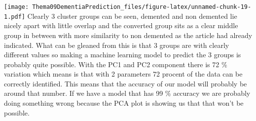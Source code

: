 \documentclass[
]{article}
\newenvironment{Shaded}{\begin{snugshade}}{\end{snugshade}}
\newcommand{\AttributeTok}[1]{\textcolor[rgb]{0.77,0.63,0.00}{#1}}
\newcommand{\CommentTok}[1]{\textcolor[rgb]{0.56,0.35,0.01}{\textit{#1}}}
\newcommand{\ConstantTok}[1]{\textcolor[rgb]{0.00,0.00,0.00}{#1}}
\newcommand{\DecValTok}[1]{\textcolor[rgb]{0.00,0.00,0.81}{#1}}
\newcommand{\FunctionTok}[1]{\textcolor[rgb]{0.00,0.00,0.00}{#1}}
\newcommand{\NormalTok}[1]{#1}
\newcommand{\OtherTok}[1]{\textcolor[rgb]{0.56,0.35,0.01}{#1}}
\newcommand{\SpecialCharTok}[1]{\textcolor[rgb]{0.00,0.00,0.00}{#1}}
\newcommand{\StringTok}[1]{\textcolor[rgb]{0.31,0.60,0.02}{#1}}
\begin{document}
\begin{Shaded}
\end{Shaded}

\texttt{[image: Thema09DementiaPrediction\_files/figure-latex/unnamed-chunk-19-1.pdf]}
Clearly 3 cluster groups can be seen, demented and non demented lie
nicely apart with little overlap and the converted group sits as a clear
middle group in between with more similarity to non demented as the
article had already indicated. What can be gleaned from this is that 3
groups are with clearly different values so making a machine learning
model to predict the 3 groups is probably quite possible. With the PC1
and PC2 component there is 72 \% variation which means is that with 2
parameters 72 procent of the data can be correctly identified. This
means that the accuracy of our model will probably be around that
number. If we have a model that has 99 \% accuracy we are probably doing
something wrong because the PCA plot is showing us that that won't be
possible.
\end{document}
